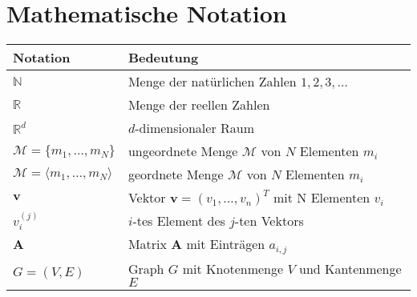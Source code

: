 
\chapter*{Mathematische Notation} \label{Notation}

\newcommand{\tabdummy}{\midrule[0pt]}

\begin{tabular}{p{}p{}}
  \textbf{Notation} & \textbf{Bedeutung} \\ \toprule[1pt]
   $\mathbb{N}$ & Menge der natürlichen Zahlen ${1, 2, 3, \ldots}$ \\ \tabdummy
   $\mathbb{R}$ & Menge der reellen Zahlen \\ \tabdummy
   $\mathbb{R}^d$ & $d$-dimensionaler Raum\\ \tabdummy
   $\mathcal{M} = \{m_1,\ldots,m_N\}$ & ungeordnete Menge $\mathcal{M}$ von $N$
   Elementen $m_i$ \\ \tabdummy
   $\mathcal{M} = \langle m_1,\ldots,m_N\rangle$ & geordnete Menge $\mathcal{M}$ von $N$
   Elementen $m_i$ \\ \tabdummy
   $\mathbf{v}$ & Vektor $\mathbf{v}=(v_1,\ldots,v_n)^T$ mit N Elementen $v_i$\\ \tabdummy
   $v^{(j)}_i$ & $i$-tes Element des $j$-ten Vektors\\ \tabdummy
   $\mathbf{A}$ & Matrix $\mathbf{A}$ mit Einträgen $a_{i,j}$\\ \tabdummy
   $G=(V,E)$ & Graph $G$ mit Knotenmenge $V$ und Kantenmenge $E$ \\ \tabdummy

\end{tabular}
